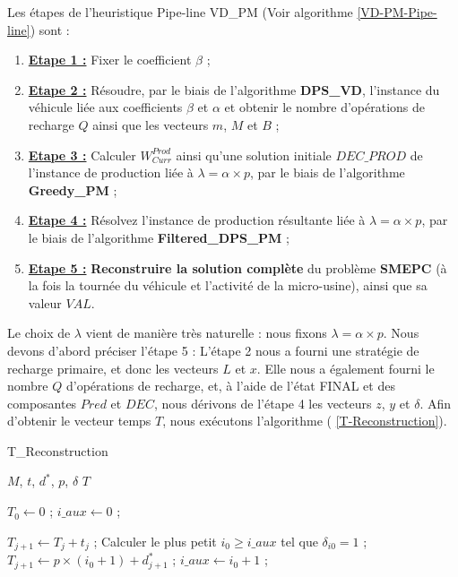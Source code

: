 Les étapes de l'heuristique Pipe-line VD\_PM (Voir algorithme \ref{VD-PM-Pipe-line}) sont : 
\begin{enumerate}
	
	\item \underline{\textbf{Etape 1 :}} Fixer le coefficient $\beta$ ; 
	\item \underline{\textbf{Etape 2 :}} Résoudre, par le biais de l'algorithme \textbf{DPS\_VD}, l'instance du véhicule liée aux coefficients $\beta$ et $\alpha$ et obtenir le nombre d'opérations de recharge $Q$ ainsi que les vecteurs $m$, $M$ et $B$ ; 
	\item \underline{\textbf{Etape 3 :}} Calculer $W^{Prod}_{Curr}$ ainsi qu'une solution initiale $DEC\_PROD$ de l'instance de production liée à $\lambda= \alpha \times p$, par le biais de l'algorithme \textbf{Greedy\_PM} ;
	\item \underline{\textbf{Etape 4 :}} Résolvez l'instance de production résultante liée à $\lambda= \alpha \times p$, par le biais de l'algorithme \textbf{Filtered\_DPS\_PM} ;
	\item \underline{\textbf{Etape 5 :}} \textbf{Reconstruire la solution complète} du problème \textbf{SMEPC} (à la fois la tournée du véhicule et l'activité de la micro-usine), ainsi que sa valeur $VAL$. 
\end{enumerate}
Le choix de $\lambda$ vient de manière très naturelle : nous fixons $\lambda = \alpha \times p$. 
Nous devons d'abord préciser l'étape 5 : L'étape 2 nous a fourni une stratégie de recharge primaire, et donc les vecteurs $L$ et $ x$. Elle nous a également fourni le nombre $Q$ d'opérations de recharge, et, à l'aide de l'état FINAL et des composantes $Pred$ et $DEC$, nous dérivons de l'étape 4 les vecteurs $z$, $y$ et $\delta$. Afin d'obtenir le vecteur temps $T$, nous exécutons l'algorithme (	\ref{T-Reconstruction}).
\begin{algorithm}
	\caption{T\_Reconstruction}
	\label{T-Reconstruction}
	\begin{algorithmic}[1]
		\REQUIRE $M$, $t$, $d^*$, $p$, $\delta$
		\ENSURE $T$
		\hline
		\vspace{0.5cm}
		
		\INITIALISATION
		\STATE $T_0 \leftarrow 0$ ; $i\_aux \leftarrow 0$ ;
		
		\vspace{0.3cm}
		
		\BOUCLEPRINCIPAL
		\STATE $ T_{j+1} \leftarrow T_j + t_j$ ;
		\ELSE
		\STATE Calculer le plus petit $i_0 \geq i\_aux$ tel que $\delta_{i0}=1$ ;
		\STATE $T_{j+1} \leftarrow p \times (i_0+1)+d^*_{j+1}$ ;
		\STATE $i\_aux \leftarrow i_0+1$ ;
		\ENDIF
		\ENDFOR
	\end{algorithmic}
\end{algorithm}


